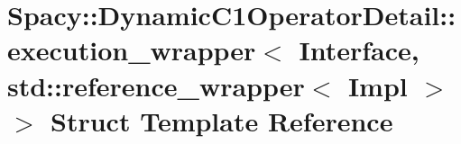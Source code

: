 \hypertarget{structSpacy_1_1DynamicC1OperatorDetail_1_1execution__wrapper_3_01Interface_00_01std_1_1reference__wrapper_3_01Impl_01_4_01_4}{\section{\-Spacy\-:\-:\-Dynamic\-C1\-Operator\-Detail\-:\-:execution\-\_\-wrapper$<$ \-Interface, std\-:\-:reference\-\_\-wrapper$<$ \-Impl $>$ $>$ \-Struct \-Template \-Reference}
\label{structSpacy_1_1DynamicC1OperatorDetail_1_1execution__wrapper_3_01Interface_00_01std_1_1reference__wrapper_3_01Impl_01_4_01_4}
}
